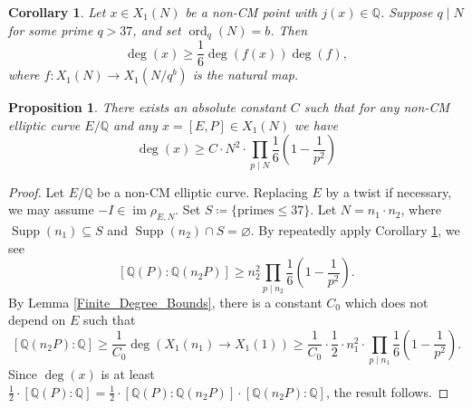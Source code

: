 \documentclass[10pt,a4paper]{amsart}
\newtheorem{corollary}{Corollary}
\newtheorem{proposition}{Proposition}
\newcommand{\Q}{\mathbb{Q}}
\newcommand{\Supp}{\operatorname{Supp}}
\DeclareMathOperator{\im}{im}
\newcommand{\ord}{\operatorname{ord}}
\begin{document}
\begin{corollary}\label{IntroCor}
Let $x\in X_1(N)$ be a non-CM point with $j(x)\in\Q$. Suppose $q \mid N$ for some prime $q > 37$, and set $\ord_{q}(N)=b$. Then \[
\deg(x)\geq\frac{1}{6}\deg(f(x))\deg(f),
\] where $f:X_1(N) \rightarrow X_1(N/q^b)$ is the natural map.    
\end{corollary}

\begin{proposition}\label{LowerBoundProp}
   There exists an absolute constant $C$ such that for any non-CM elliptic curve $E/\Q$ and any $x=[E,P]\in X_1(N)$ we have
    \[
    \deg(x) \geq C \cdot N^2\cdot \prod_{p \mid N}\frac{1}{6}\left(1-\frac{1}{p^2}\right) \]
\end{proposition}

\begin{proof}
   Let $E/\Q$ be a non-CM elliptic curve. Replacing $E$ by a twist if necessary, we may assume $-I \in \im \rho_{E,N}$. Set $S \coloneqq \{\text{primes} \leq 37\}$. Let $N=n_1\cdot n_2$, where $\Supp(n_1) \subseteq S$ and $\Supp(n_2) \cap S=\varnothing$. By repeatedly apply Corollary \ref{IntroCor}, we see 
        \[
        [\Q(P):\Q(n_2P)]\geq n_2^2\prod_{p \mid n_2}\frac{1}{6}\left(1-\frac{1}{p^2}\right).     \]
        By Lemma \ref{Finite_Degree_Bounds}, there is a constant $C_0$ which does not depend on $E$ such that
 \[
        [\Q(n_2P):\Q] \geq \frac{1}{C_0} \deg(X_1(n_1) \rightarrow X_1(1)) \geq \frac{1}{C_0} \cdot\frac{1}{2} \cdot n_1^2\cdot \prod_{p \mid n_1}\frac{1}{6}\left(1-\frac{1}{p^2}\right).
        \]
        Since $\deg(x)$ is at least $\frac{1}{2}\cdot [\Q(P):\Q] =\frac{1}{2}\cdot[\Q(P):\Q(n_2P)]\cdot[\Q(n_2P):\Q]$, the result follows. \qedhere
  
\end{proof}
\end{document}
